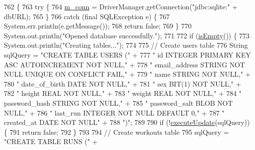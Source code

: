 \begin{DoxyCode}
762                                      \{
763         \textcolor{keywordflow}{try} \{
764             \hyperlink{classcom_1_1activitytracker_1_1_d_b_manager_a064088d13ac09eb147fdc19268771521}{m\_conn} = DriverManager.getConnection(\textcolor{stringliteral}{"jdbc:sqlite:"} + dbURL);
765         \}
766         \textcolor{keywordflow}{catch} (\textcolor{keyword}{final} SQLException e) \{
767             System.err.println(e.getMessage());
768             \textcolor{keywordflow}{return} \textcolor{keyword}{false};
769         \}
770         System.out.println(\textcolor{stringliteral}{"Opened database successfully."});
771 
772         \textcolor{keywordflow}{if} (\hyperlink{classcom_1_1activitytracker_1_1_d_b_manager_af9ab112f840e3c803b6b28a2f1a15215}{isEmpty}()) \{
773             System.out.println(\textcolor{stringliteral}{"Creating tables..."});
774 
775             \textcolor{comment}{// Create users table}
776             String sqlQuery = \textcolor{stringliteral}{"CREATE TABLE USERS ("} +
777                     \textcolor{stringliteral}{"    id            INTEGER PRIMARY KEY ASC AUTOINCREMENT NOT NULL,"} +
778                     \textcolor{stringliteral}{"    email\_address STRING  NOT NULL UNIQUE ON CONFLICT FAIL,"} +
779                     \textcolor{stringliteral}{"    name          STRING  NOT NULL,"} +
780                     \textcolor{stringliteral}{"    date\_of\_birth DATE    NOT NULL,"} +
781                     \textcolor{stringliteral}{"    sex           BIT(1)  NOT NULL,"} +
782                     \textcolor{stringliteral}{"    height        REAL    NOT NULL,"} +
783                     \textcolor{stringliteral}{"    weight        REAL    NOT NULL,"} +
784                     \textcolor{stringliteral}{"    password\_hash STRING  NOT NULL,"} +
785                     \textcolor{stringliteral}{"    password\_salt BLOB    NOT NULL,"} +
786                     \textcolor{stringliteral}{"    last\_run  INTEGER NOT NULL DEFAULT 0,"} +
787                     \textcolor{stringliteral}{"    created\_at    DATE    NOT NULL"} +
788                     \textcolor{stringliteral}{")"};
789 
790             \textcolor{keywordflow}{if} (!\hyperlink{classcom_1_1activitytracker_1_1_d_b_manager_a382397e2bdf309901d1c80ff66be69b7}{executeUpdate}(sqlQuery)) \{
791                 \textcolor{keywordflow}{return} \textcolor{keyword}{false};
792             \}
793 
794             \textcolor{comment}{// Create workouts table}
795             sqlQuery = \textcolor{stringliteral}{"CREATE TABLE RUNS ("} +

\end{DoxyCode}
